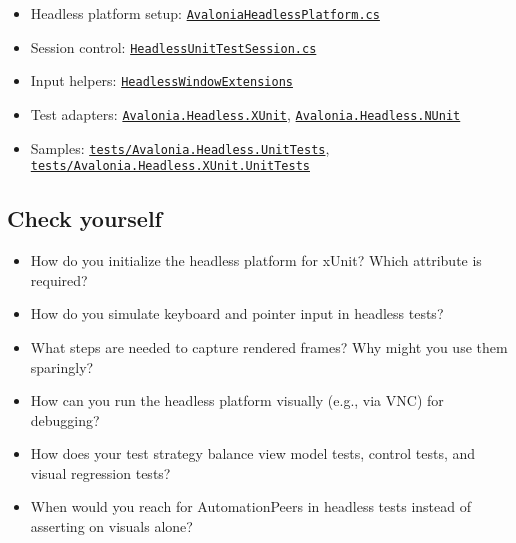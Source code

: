 \begin{itemize}
\tightlist
\item
  Headless platform setup:
  \href{https://github.com/AvaloniaUI/Avalonia/blob/master/src/Headless/Avalonia.Headless/AvaloniaHeadlessPlatform.cs}{\passthrough{\lstinline!AvaloniaHeadlessPlatform.cs!}}
\item
  Session control:
  \href{https://github.com/AvaloniaUI/Avalonia/blob/master/src/Headless/Avalonia.Headless/HeadlessUnitTestSession.cs}{\passthrough{\lstinline!HeadlessUnitTestSession.cs!}}
\item
  Input helpers:
  \href{https://github.com/AvaloniaUI/Avalonia/blob/master/src/Headless/Avalonia.Headless/HeadlessWindowExtensions.cs}{\passthrough{\lstinline!HeadlessWindowExtensions!}}
\item
  Test adapters:
  \href{https://github.com/AvaloniaUI/Avalonia/tree/master/src/Headless/Avalonia.Headless.XUnit}{\passthrough{\lstinline!Avalonia.Headless.XUnit!}},
  \href{https://github.com/AvaloniaUI/Avalonia/tree/master/src/Headless/Avalonia.Headless.NUnit}{\passthrough{\lstinline!Avalonia.Headless.NUnit!}}
\item
  Samples:
  \href{https://github.com/AvaloniaUI/Avalonia/tree/master/tests/Avalonia.Headless.UnitTests}{\passthrough{\lstinline!tests/Avalonia.Headless.UnitTests!}},
  \href{https://github.com/AvaloniaUI/Avalonia/tree/master/tests/Avalonia.Headless.XUnit.UnitTests}{\passthrough{\lstinline!tests/Avalonia.Headless.XUnit.UnitTests!}}
\end{itemize}

\subsection{Check yourself}\label{check-yourself-19}

\begin{itemize}
\tightlist
\item
  How do you initialize the headless platform for xUnit? Which attribute
  is required?
\item
  How do you simulate keyboard and pointer input in headless tests?
\item
  What steps are needed to capture rendered frames? Why might you use
  them sparingly?
\item
  How can you run the headless platform visually (e.g., via VNC) for
  debugging?
\item
  How does your test strategy balance view model tests, control tests,
  and visual regression tests?
\item
  When would you reach for AutomationPeers in headless tests instead of
  asserting on visuals alone?
\end{itemize}

